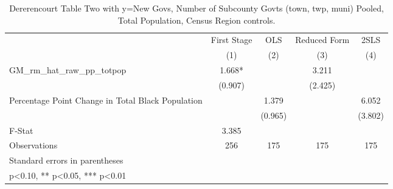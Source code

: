 \begin{table}[htbp]\centering
\def\sym#1{\ifmmode^{#1}\else\(^{#1}\)\fi}
\caption{Dererencourt Table Two with y=New Govs, Number of Subcounty Govts (town, twp, muni)  Pooled, Total Population, Census Region controls.}
\begin{tabular}{l*{4}{c}}
\toprule
                    & First Stage   &         OLS   &Reduced Form   &        2SLS   \\
                    &\multicolumn{1}{c}{(1)}   &\multicolumn{1}{c}{(2)}   &\multicolumn{1}{c}{(3)}   &\multicolumn{1}{c}{(4)}   \\
\midrule
GM\_rm\_hat\_raw\_pp\_totpop&       1.668*  &               &       3.211   &               \\
                    &     (0.907)   &               &     (2.425)   &               \\
\addlinespace
Percentage Point Change in Total Black Population&               &       1.379   &               &       6.052   \\
                    &               &     (0.965)   &               &     (3.802)   \\
\midrule
F-Stat              &       3.385   &               &               &               \\
Observations        &         256   &         175   &         175   &         175   \\
\bottomrule
\multicolumn{5}{l}{\footnotesize Standard errors in parentheses}\\
\multicolumn{5}{l}{\footnotesize * p<0.10, ** p<0.05, *** p<0.01}\\
\end{tabular}
\end{table}
